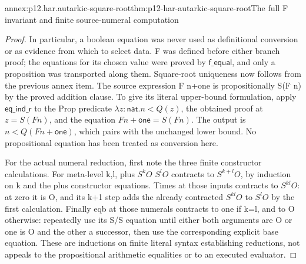 \begin{annexitem}{annex:p12.har.autarkic-square-root}{thm:p12-har-autarkic-square-root}{The full F invariant and finite source-numeral computation}
\begin{proof}
In particular, a boolean equation was never used as definitional
conversion or as evidence from which to select data. F was defined
before either branch proof; the equations for its chosen value were
proved by \(\mathsf{f\_equal}\), and only a proposition was transported along them.
Square-root uniqueness now follows from the previous annex item.
The source expression F n+one is propositionally S(F n) by the
proved addition clause. To give its literal upper-bound formulation,
apply \(\mathsf{eq\_ind\_r}\) to the Prop predicate \(\lambda z:\mathsf{nat}.n<Q(z)\),
the obtained proof at \(z=S(F n)\), and the equation
\(F n+\mathsf{one}=S(F n)\). The output is
\(n<Q(F n+\mathsf{one})\), which pairs with the unchanged lower
bound. No propositional equation has been treated as conversion here.

For the actual numeral reduction, first note the three finite
constructor calculations. For meta-level k,l,
plus \(S^kO\) \(S^lO\) contracts to \(S^{k+l}O\), by induction
on k and the plus constructor equations. Times at those inputs
contracts to \(S^{kl}O\): at zero it is O, and its k+1 step
adds the already contracted \(S^{kl}O\) to \(S^lO\) by the first
calculation. Finally eqb at those numerals contracts to one if k=l,
and to O otherwise: repeatedly use its S/S equation until either
both arguments are O or one is O and the other a successor, then
use the corresponding explicit base equation. These are inductions
on finite literal syntax establishing reductions, not appeals to
the propositional arithmetic equalities or to an executed evaluator.


\end{proof}
\end{annexitem}
